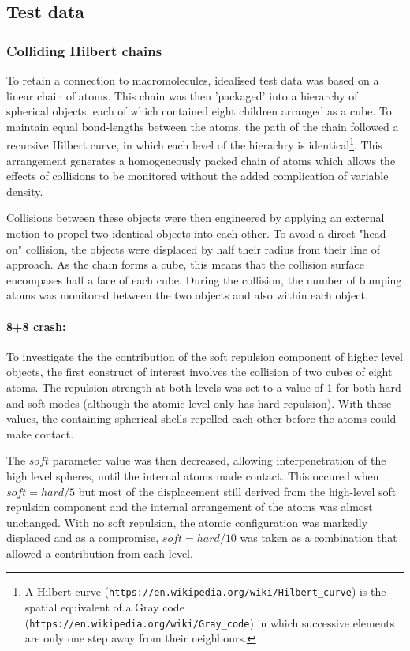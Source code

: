 \subsection{Test data}

\subsubsection{Colliding Hilbert chains}

To retain a connection to macromolecules, idealised test data was based on a linear chain of atoms.
This chain was then 'packaged' into a hierarchy of spherical objects, each of which contained
eight children arranged as a cube.   To maintain equal bond-lengths between the atoms, the path of the
chain followed a recursive Hilbert curve, in which each level of the hierachry is identical\footnote{
A Hilbert curve ({\tt https://en.wikipedia.org/wiki/Hilbert\_curve}) is the spatial equivalent of a 
Gray code ({\tt https://en.wikipedia.org/wiki/Gray\_code}) in which successive elements are
only one step away from their neighbours.
}.   This arrangement generates a homogeneously packed chain of atoms which allows the effects of
collisions to be monitored without the added complication of variable density.

Collisions between these objects were then engineered by applying an external
motion to propel two identical objects into each other.   To avoid a direct "head-on"
collision, the objects were displaced by half their radius from their line of approach.
As the chain forms a cube, this means that the collision surface encompases half a face of each cube.
During the collision, the number of bumping atoms was monitored between the two objects
and also within each object.

\paragraph{8+8 crash:\\}

To investigate the the contribution of the soft repulsion component of higher level objects,
the first construct of interest involves the collision of two cubes of eight atoms.  The
repulsion strength at both levels was set to a value of 1 for both hard and soft modes
(although the atomic level only has hard repulsion).   With these values, the containing
spherical shells repelled each other before the atoms could make contact.

The $soft$ parameter value was then decreased, allowing interpenetration of the high
level spheres,  until the internal atoms made contact.   This occured when $soft = hard/5$
but most of the displacement still derived from the high-level soft repulsion component
and the internal arrangement of the atoms was almost unchanged.   With no soft repulsion,
the atomic configuration was markedly displaced and as a compromise, $soft = hard/10$
was taken as a combination that allowed a contribution from each level.

